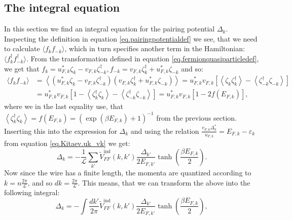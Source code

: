 \subsection{The integral equation} \label{subsec.pairingpotential.integralequation}
In this section we find an integral equation for the pairing potential $\Delta_k$. Inspecting the definition in equation \eqref{eq.pairingpotentialdef} we see, that we need to calculate $\langle f_k f_{-k} \rangle$, which in turn specifies another term in the Hamiltonian: $\langle f^\dagger_k f^\dagger_{-k} \rangle$. From the transformation defined in equation \eqref{eq.fermionquasiparticledef}, we get that $f_k = u^*_{F,k}\zeta_k - v_{F,k}\zeta^\dagger_{-k}, f_{-k} = v_{F,k}\zeta^\dagger_k + u^*_{F,k}\zeta_{-k}$ and so:
\begin{align}
\langle f_k f_{-k} \rangle &= \left \langle (u^*_{F,k}\zeta_k - v_{F,k}\zeta^\dagger_{-k}) (v_{F,k}\zeta^\dagger_k + u^*_{F,k}\zeta_{-k}) \right \rangle = u^*_{F,k}v_{F,k}\left[ \left \langle \zeta_k \zeta^\dagger_{k} \right \rangle - \left \langle \zeta^\dagger_{-k} \zeta_{-k} \right \rangle \right]  \nonumber \\
& =  u^*_{F,k}v_{F,k}\left[ 1 - \left \langle \zeta^\dagger_{k} \zeta_k \right \rangle - \left \langle \zeta^\dagger_{-k} \zeta_{-k} \right \rangle \right] = u^*_{F,k}v_{F,k}\left[1 - 2f(E_{F,k})\right], \nonumber
\end{align}
where we in the last equality use, that $\left \langle \zeta^\dagger_{k} \zeta_{k} \right \rangle = f(E_{F,k})=(\exp(\beta E_{F,k})+1)^{-1} $ from the previous section. Inserting this into the expression for $\Delta_k$ and using the relation $\frac{v_{F,k}\Delta^*_k}{u_{F,k}}=E_{F,k}-\varepsilon_k$ from equation \eqref{eq.Kitaev.uk_vk} we get:
\begin{equation}
\Delta_k = - \frac{1}{\mathcal{L}}\sum_{k'} \tilde{V}^\text{ind}_{FF}(k,k')\frac{\Delta_{k'}}{2E_{F,k'}}\tanh\left(\frac{\beta E_{F,k}}{2}\right).
\label{eq.PairingpotentialSumEquation}
\end{equation} 
Now since the wire has a finite length, the momenta are quantized according to $k = n\frac{2\pi}{\mathcal{L}}$, and so $dk = \frac{2\pi}{\mathcal{L}}$. This means, that we can transform the above into the following integral:
\begin{equation}
\Delta_k = - \int \frac{dk'}{2\pi} \tilde{V}^\text{ind}_{FF}(k,k')\frac{\Delta_{k'}}{2E_{F,k'}}\tanh\left(\frac{\beta E_{F,k}}{2}\right),
\label{eq.PairingpotentialIntegralEquation}
\end{equation} 
